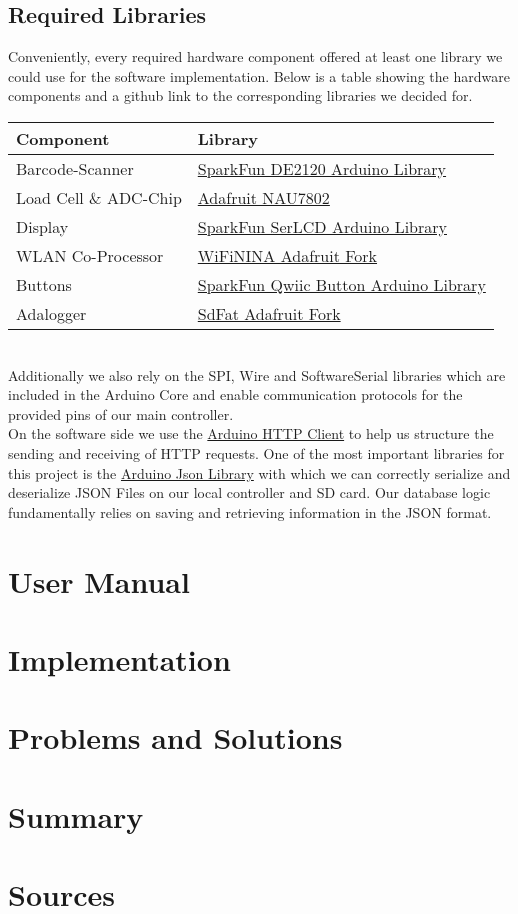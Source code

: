 \documentclass{article}
\begin{document}
\subsection{Required Libraries}
Conveniently, every required hardware component offered at least one library we could use for the software implementation. 
Below is a table showing the hardware components and a github link to the corresponding libraries we decided for.
\\[10pt]
\begin{tabular}{l l}
	\hline
	Component              & Library\\
	\hline
	Barcode-Scanner        & \href{https://github.com/sparkfun/SparkFun_DE2120_Arduino_Library}{SparkFun DE2120 Arduino Library}\\
	Load Cell \& ADC-Chip  & \href{https://github.com/adafruit/Adafruit_NAU7802}{Adafruit NAU7802}\\
	Display                & \href{https://github.com/sparkfun/SparkFun_SerLCD_Arduino_Library}{SparkFun SerLCD Arduino Library}\\
	WLAN Co-Processor      & \href{https://github.com/adafruit/WiFiNINA}{WiFiNINA Adafruit Fork}\\
	Buttons                & \href{https://github.com/sparkfun/SparkFun_Qwiic_Button_Arduino_Library}{SparkFun Qwiic Button Arduino Library}\\
	Adalogger              & \href{https://github.com/adafruit/SdFat}{SdFat Adafruit Fork}\\
	\hline
\end{tabular} \\[10pt]
Additionally we also rely on the SPI, Wire and SoftwareSerial libraries which are included in the Arduino Core and enable communication protocols for the provided pins of our main controller. \\
On the software side we use the \href{https://github.com/arduino-libraries/ArduinoHttpClient}{Arduino HTTP Client} to help us structure the sending and receiving of HTTP requests.
One of the most important libraries for this project is the \href{https://github.com/bblanchon/ArduinoJson}{Arduino Json Library} with which we can correctly serialize and deserialize JSON Files on our local controller and SD card.
Our database logic fundamentally relies on saving and retrieving information in the JSON format.

\section{User Manual}

\section{Implementation}

\section{Problems and Solutions}

\section{Summary}

\section{Sources}





\end{document}
